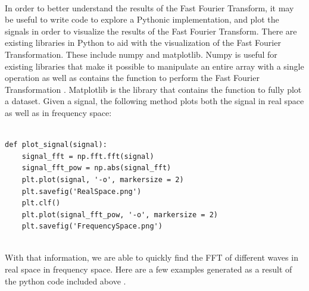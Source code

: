 \documentclass{amsproc}
\begin{document}
\mbox{}	 \\
\indent In order to better understand the results of the Fast Fourier Transform, it may be useful to write code to explore a Pythonic implementation, and  plot the signals in order to visualize the results of the Fast Fourier Transform. There are existing libraries in Python to aid with the visualization of the Fast Fourier Transformation. These include numpy and matplotlib. Numpy is useful for existing libraries that make it possible to manipulate an entire array with a single operation as well as contains the function to perform the Fast Fourier Transformation \cite{Discrete}. Matplotlib is the library that contains the function to fully plot a dataset. Given a signal, the following method plots both the signal in real space as well as in frequency space:

\begin{Verbatim}[tabsize=4]

def plot_signal(signal):
	signal_fft = np.fft.fft(signal)
	signal_fft_pow = np.abs(signal_fft)
	plt.plot(signal, '-o', markersize = 2)
	plt.savefig('RealSpace.png')
	plt.clf()
	plt.plot(signal_fft_pow, '-o', markersize = 2)
	plt.savefig('FrequencySpace.png')
	
\end{Verbatim}

With that information, we are able to quickly find the FFT of different waves in real space in frequency space. Here are a few examples generated as a result of the python code included above \cite{Intuition}. 
\end{document}
